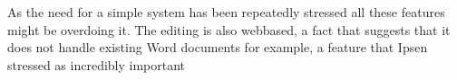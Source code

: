 As the need for a simple system has been repeatedly stressed all these features might be overdoing it.
The editing is also webbased, a fact that suggests that it does not handle existing Word documents for example, a feature that Ipsen stressed as incredibly important

